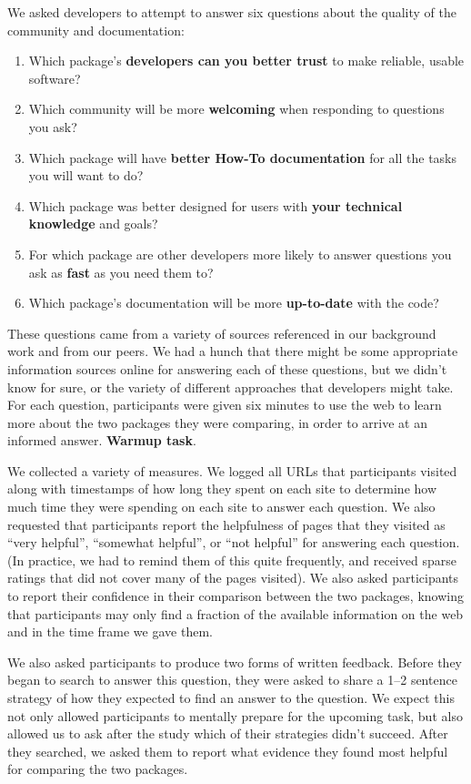 We asked developers to attempt to answer six questions about the quality of the community and documentation:
\begin{enumerate}
\setlength{\itemsep}{0pt}
\setlength{\parskip}{0pt}
\setlength{\parsep}{0pt}
\item Which package's \textbf{developers can you better trust} to make reliable, usable software?
\item Which community will be more \textbf{welcoming} when responding to questions you ask?
\item Which package will have \textbf{better How-To documentation} for all the tasks you will want to do?
\item Which package was better designed for users with \textbf{your technical knowledge} and goals?
\item For which package are other developers more likely to answer questions you ask as \textbf{fast} as you need them to?
\item Which package's documentation will be more \textbf{up-to-date} with the code?
\end{enumerate}
These questions came from a variety of sources referenced in our background work and from our peers.
We had a hunch that there might be some appropriate information sources online for answering each of these questions, but we didn't know for sure, or the variety of different approaches that developers might take.
For each question, participants were given six minutes to use the web to learn more about the two packages they were comparing, in order to arrive at an informed answer.
\textbf{Warmup task}.

We collected a variety of measures.
We logged all URLs that participants visited along with timestamps of how long they spent on each site to determine how much time they were spending on each site to answer each question.
We also requested that participants report the helpfulness of pages that they visited as ``very helpful'', ``somewhat helpful'', or ``not helpful'' for answering each question.
(In practice, we had to remind them of this quite frequently, and received sparse ratings that did not cover many of the pages visited).
We also asked participants to report their confidence in their comparison between the two packages, knowing that participants may only find a fraction of the available information on the web and in the time frame we gave them.

We also asked participants to produce two forms of written feedback.
Before they began to search to answer this question, they were asked to share a 1--2 sentence strategy of how they expected to find an answer to the question.
We expect this not only allowed participants to mentally prepare for the upcoming task, but also allowed us to ask after the study which of their strategies didn't succeed.
After they searched, we asked them to report what evidence they found most helpful for comparing the two packages.

